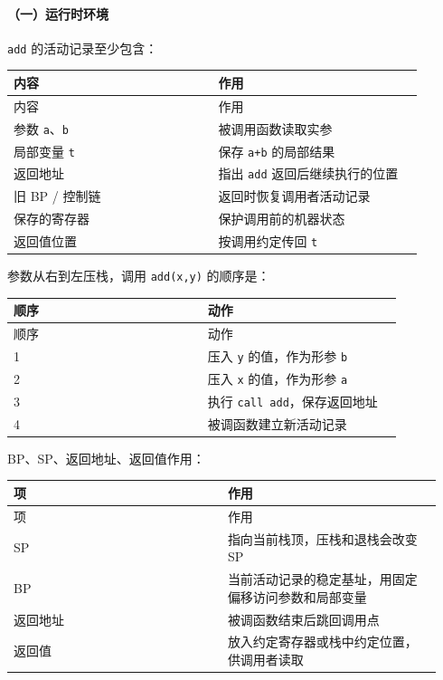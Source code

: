 \documentclass[UTF8]{ctexart}
\begin{document}
\paragraph*{（一）运行时环境}

\texttt{add} 的活动记录至少包含：

\begin{longtable}{|p{0.47\linewidth}|p{0.47\linewidth}|}
\hline
内容 & 作用 \\
\hline
\endfirsthead
内容 & 作用 \\
\hline
\endhead
参数 \texttt{a}、\texttt{b} & 被调用函数读取实参 \\
\hline
局部变量 \texttt{t} & 保存 \texttt{a+b} 的局部结果 \\
\hline
返回地址 & 指出 \texttt{add} 返回后继续执行的位置 \\
\hline
旧 BP / 控制链 & 返回时恢复调用者活动记录 \\
\hline
保存的寄存器 & 保护调用前的机器状态 \\
\hline
返回值位置 & 按调用约定传回 \texttt{t} \\
\hline
\end{longtable}

参数从右到左压栈，调用 \texttt{add(x,y)} 的顺序是：

\begin{longtable}{|p{0.47\linewidth}|p{0.47\linewidth}|}
\hline
顺序 & 动作 \\
\hline
\endfirsthead
顺序 & 动作 \\
\hline
\endhead
1 & 压入 \texttt{y} 的值，作为形参 \texttt{b} \\
\hline
2 & 压入 \texttt{x} 的值，作为形参 \texttt{a} \\
\hline
3 & 执行 \texttt{call add}，保存返回地址 \\
\hline
4 & 被调函数建立新活动记录 \\
\hline
\end{longtable}

BP、SP、返回地址、返回值作用：

\begin{longtable}{|p{0.47\linewidth}|p{0.47\linewidth}|}
\hline
项 & 作用 \\
\hline
\endfirsthead
项 & 作用 \\
\hline
\endhead
SP & 指向当前栈顶，压栈和退栈会改变 SP \\
\hline
BP & 当前活动记录的稳定基址，用固定偏移访问参数和局部变量 \\
\hline
返回地址 & 被调函数结束后跳回调用点 \\
\hline
返回值 & 放入约定寄存器或栈中约定位置，供调用者读取 \\
\hline
\end{longtable}
\end{document}
